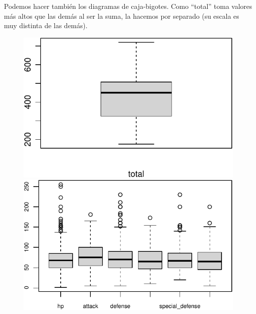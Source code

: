 \documentclass[
  11.8pt,
]{extreport}
\begin{document}
Podemos hacer también los diagramas de caja-bigotes. Como ``total'' toma
valores más altos que las demás al ser la suma, la hacemos por separado
(su escala es muy distinta de las demás).

\begin{figure}

\begin{minipage}{0.50\linewidth}
\begin{center}
\includegraphics{trabajo_files/figure-pdf/unnamed-chunk-11-1.pdf}
\end{center}
\end{minipage}%
%
\begin{minipage}{0.50\linewidth}
\begin{center}
\includegraphics{trabajo_files/figure-pdf/unnamed-chunk-11-2.pdf}
\end{center}
\end{minipage}%

\end{figure}%
\end{document}
